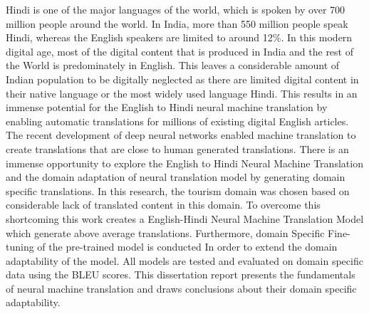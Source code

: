 \documentclass[a4paper, 12pt, oneside]{report}         %
\begin{document}
\begin{thesisabstract}                          %
Hindi is one of the major languages of the world, which is spoken by over 700 million people around the world. In India, more than 550 million people speak Hindi, whereas the English speakers are limited to around 12\%. In this modern digital age, most of the digital content that is produced in India and the rest of the World is predominately in English. This leaves a considerable amount of Indian population to be digitally neglected as there are limited digital content in their native language or the most widely used language Hindi. This results in an immense potential for the English to Hindi neural machine translation by enabling automatic translations for millions of existing digital English articles. The recent development of deep neural networks enabled machine translation to create translations that are close to human generated translations. There is an immense opportunity to explore the English to Hindi Neural Machine Translation and the domain adaptation of neural translation model by generating domain specific translations. In this research, the tourism domain was chosen based on considerable lack of translated content in this domain. To overcome this shortcoming this work creates a English-Hindi Neural Machine Translation Model which generate above average translations. Furthermore, domain Specific Fine-tuning of the pre-trained model is conducted In order to extend the domain adaptability of the model. All models are tested and evaluated on domain specific data using the BLEU scores. This dissertation report presents the fundamentals of neural machine translation and draws conclusions about their domain specific adaptability.



\end{thesisabstract}
\end{document}
